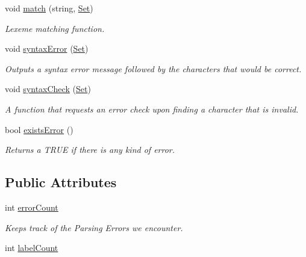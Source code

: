 \begin{DoxyCompactItemize}
void \hyperlink{classParser_afd75ba38a886da3930c4a29f5d353a62}{match} (string, \hyperlink{classSet}{Set})
\begin{DoxyCompactList}\small\item\em Lexeme matching function. \item\end{DoxyCompactList}\item 
void \hyperlink{classParser_a705ca7e2357f506dc5bea989e40ca11f}{syntaxError} (\hyperlink{classSet}{Set})
\begin{DoxyCompactList}\small\item\em Outputs a syntax error message followed by the characters that would be correct. \item\end{DoxyCompactList}\item 
void \hyperlink{classParser_a61a1e512e33d3498f45d1e6f7c7aaf4d}{syntaxCheck} (\hyperlink{classSet}{Set})
\begin{DoxyCompactList}\small\item\em A function that requests an error check upon finding a character that is invalid. \item\end{DoxyCompactList}\item 
bool \hyperlink{classParser_a7f02236268961b80c3d76902969a728a}{existsError} ()
\begin{DoxyCompactList}\small\item\em Returns a TRUE if there is any kind of error. \item\end{DoxyCompactList}\end{DoxyCompactItemize}
\subsection*{Public Attributes}
\begin{DoxyCompactItemize}
\item 
int \hyperlink{classParser_a613d04900f76c66dfdf41e47aff6e539}{errorCount}
\begin{DoxyCompactList}\small\item\em Keeps track of the Parsing Errors we encounter. \item\end{DoxyCompactList}\item 
int \hyperlink{classParser_a10a64572cec26c50bdef9575fc79540e}{labelCount}
\end{DoxyCompactItemize}

